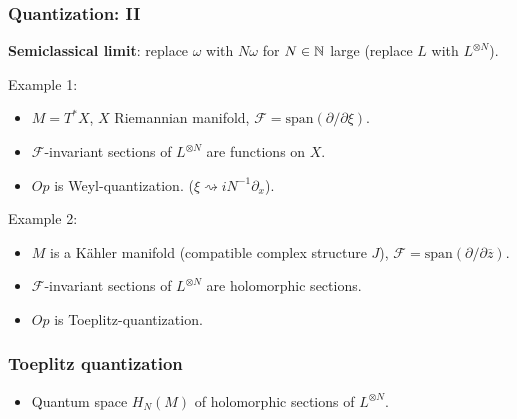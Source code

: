 \documentclass[mathserif]{beamer}
\begin{document}
\begin{frame}
  \frametitle{Quantization: II}
  {\bfseries Semiclassical limit}: replace $\omega$ with $N\omega$ for
  $N\in \mathbb{N}$ large (replace $L$ with $L^{\otimes N}$).

  \vfill

  Example 1:
  \begin{itemize}
  \item 
  $M=T^*X$, $X$ Riemannian manifold,
  $\mathcal{F}=\mathrm{span}(\partial/\partial \xi)$.
\item 
  $\mathcal{F}$-invariant sections of
  $L^{\otimes N}$ are functions on $X$.
\item $Op$ is
  Weyl-quantization. ($\xi\rightsquigarrow iN^{-1}\partial_x$).
\end{itemize}

\vfill

Example 2:
\begin{itemize}
\item $M$ is a Kähler manifold (compatible complex structure $J$),
  $\mathcal{F}=\mathrm{span}(\partial/\partial \overline{z})$.
\item $\mathcal{F}$-invariant sections of $L^{\otimes N}$ are
  holomorphic sections.
\item $Op$ is Toeplitz-quantization.
\end{itemize}
\end{frame}


\begin{frame}
  \frametitle{Toeplitz quantization}
  \begin{itemize}
  \item Quantum space $H_N(M)$ of holomorphic sections of
  $L^{\otimes N}$.
  \end{itemize}

  \vfill
  
\end{frame}
\end{document}
